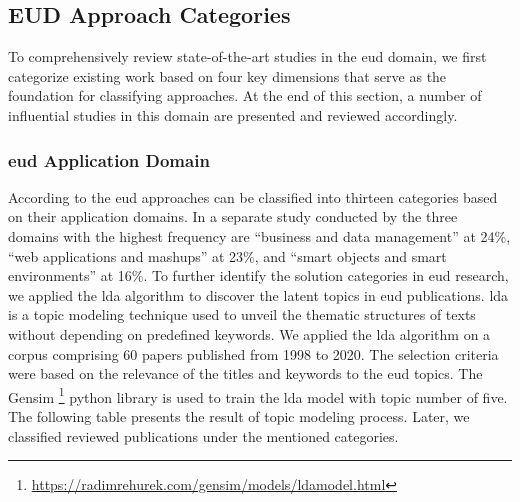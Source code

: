 \vspace{-10pt}
\hypertarget{sec:eud-approaches}{%
\subsection{EUD Approach Categories }\label{sec:eud-approaches}}
\vspace{10pt}

To comprehensively review state-of-the-art studies in the \gls{eud} domain, we first categorize existing work based on four key dimensions that serve as the foundation for classifying approaches. At the end of this section, a number of influential studies in this domain are presented and reviewed accordingly.

\hypertarget{edu-domain}{%
\subsubsection*{\gls{eud} Application Domain}\label{edu-domain}}
According to \autocite{Maceli2017} the \gls{eud} approaches can be classified into thirteen categories based on their application domains. In a separate study conducted by \autocite{Barricelli2019} the three domains with the highest frequency are “business and data management” at 24\%, “web applications and mashups” at 23\%, and “smart objects and smart environments” at 16\%. 
To further identify the solution categories in \gls{eud} research, we applied the \gls{lda} algorithm to discover the latent topics in \gls{eud} publications. \gls{lda} is a topic modeling technique used to unveil the thematic structures of texts without depending on predefined keywords. We applied the \gls{lda} algorithm on a corpus comprising 60 papers published from 1998 to 2020. The selection criteria were based on the relevance of the titles and keywords to the \gls{eud} topics. The Gensim \footnote{\url{https://radimrehurek.com/gensim/models/ldamodel.html}}   python library is used to train the \gls{lda} model with topic number of five. The following table presents the result of topic modeling process. Later, we classified reviewed publications under the mentioned categories. 

